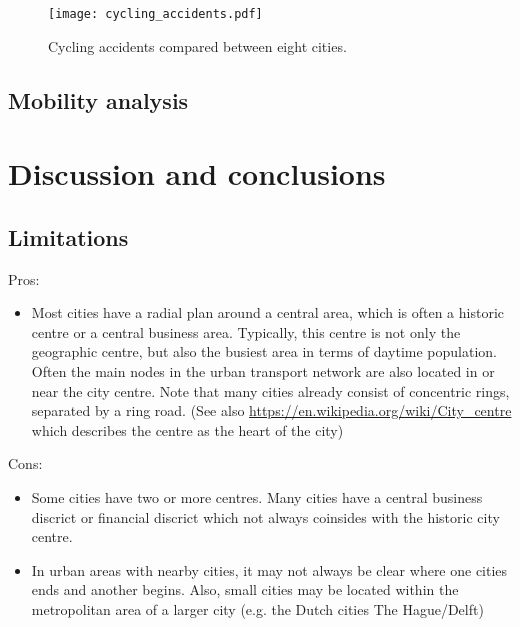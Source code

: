 \documentclass{josis}
\begin{document}
\begin{figure}[tbh]
\centering
\texttt{[image: cycling\_accidents.pdf]}
\caption{Cycling accidents compared between eight cities.}\label{fig:cyclAccidents}
\end{figure}

\subsection{Mobility analysis}


\section{Discussion and conclusions}


\subsection{Limitations}

Pros:

\begin{itemize}
\item Most cities have a radial plan around a central area, which is often a historic centre or a central business area. Typically, this centre is not only the geographic centre, but also the busiest area in terms of daytime population. Often the main nodes in the urban transport network are also located in or near the city centre. Note that many cities already consist of concentric rings, separated by a ring road. (See also \url{https://en.wikipedia.org/wiki/City_centre} which describes the centre as the heart of the city)
\end{itemize}

Cons:

\begin{itemize}
\item Some cities have two or more centres. Many cities have a central business discrict or financial discrict which not always coinsides with the historic city centre.
\item In urban areas with nearby cities, it may not always be clear where one cities ends and another begins. Also, small cities may be located within the metropolitan area of a larger city (e.g. the Dutch cities The Hague/Delft)
\end{itemize}



\end{document}

